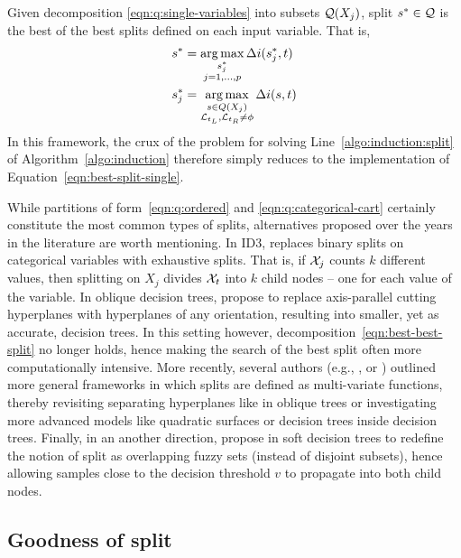 Given decomposition \ref{eqn:q:single-variables} into subsets ${\cal Q}(X_j)$,
split $s^* \in {\cal Q}$ is the best of the best splits defined on each input
variable. That is,
\begin{align}
s^* &= \operatorname*{arg\,max}_{\substack{s^*_j\\ j=1, \dots, p}} \Delta i(s^*_j, t) \label{eqn:best-best-split}\\
s^*_j &= \operatorname*{arg\,max}_{\substack{s \in Q(X_j)\\ {\cal L}_{t_L}, {\cal L}_{t_R} \neq \phi}} \Delta i(s, t) \label{eqn:best-split-single}
\end{align}
In this framework, the crux of the problem for solving
Line~\ref{algo:induction:split} of Algorithm~\ref{algo:induction} therefore
simply reduces to the implementation of Equation~\ref{eqn:best-split-single}.

While partitions of form~\ref{eqn:q:ordered} and \ref{eqn:q:categorical-cart}
certainly constitute the most common types of splits, alternatives proposed
over the years in the literature are worth mentioning. In ID3,
\citet{quinlan:1986} replaces binary splits on categorical variables with
exhaustive splits. That is, if ${\cal X}_j$ counts $k$ different values, then
splitting on $X_j$ divides ${\cal X}_t$ into $k$ child nodes -- one for each
value of the variable. In oblique decision trees, \citet{heath:1993} propose to
replace axis-parallel cutting hyperplanes with hyperplanes of any orientation,
resulting into smaller, yet as accurate, decision trees. In this setting
however, decomposition~\ref{eqn:best-best-split} no longer holds, hence making
the search of the best split often more computationally intensive. More
recently, several authors (e.g., \citep{gama:2004}, \citep{criminisi:2013} or
\citep{botta:2013}) outlined more general frameworks in which splits are
defined as multi-variate functions, thereby revisiting separating hyperplanes
like in oblique trees or investigating more advanced models like quadratic
surfaces or decision trees inside decision trees. Finally, in an another
direction, \citet{olaru:2003} propose in soft decision trees to redefine the
notion of split as overlapping fuzzy sets (instead of disjoint subsets), hence
allowing samples close to the decision threshold $v$ to propagate into both
child nodes.

\subsection{Goodness of split}
\label{sec:3:criteria}

